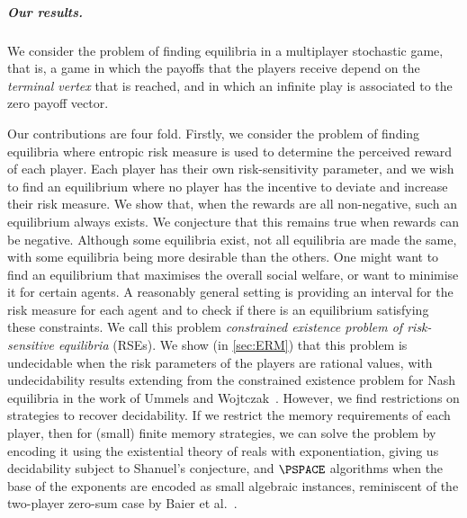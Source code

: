 
\subparagraph*{Our results.}
We consider the problem of finding equilibria in a multiplayer stochastic game, that is, a game in which the payoffs that the players receive depend on the \emph{terminal vertex} that is reached, and in which an infinite play is associated to the zero payoff vector.

Our contributions are four fold. 
Firstly, we consider the problem of finding equilibria where entropic risk measure is used to determine the perceived reward of each player.  Each player has their own risk-sensitivity parameter, and we wish to find an equilibrium where no player has the incentive to deviate and increase their risk measure. We show that, when the rewards are all non-negative, such an equilibrium always exists.
We conjecture that this remains true when rewards can be negative.
Although some equilibria exist, not all equilibria are made the same, with some equilibria being more desirable than the others. One might want to find an equilibrium that maximises the overall social welfare, or want to minimise it for certain agents. A reasonably general setting is providing an interval for the risk measure for each agent and to check if there is an equilibrium satisfying these constraints. We call this problem \emph{constrained existence problem of risk-sensitive equilibria} (RSEs). 
We show (in \cref{sec:ERM}) that this problem is undecidable when the risk parameters of the players are rational values, with undecidability results extending from the constrained existence problem for Nash equilibria in the work of Ummels and Wojtczak~\cite{UW11}. However, we find restrictions on strategies to recover decidability. %
If we restrict the memory requirements of each player, then for (small) finite memory strategies, we can solve the problem by encoding it using the existential theory of reals with exponentiation, giving us decidability subject to Shanuel's conjecture, and $\PSPACE$ algorithms when the base of the exponents are encoded as small algebraic instances, reminiscent of the two-player zero-sum case by Baier et al.~\cite{BCMP24}. 

